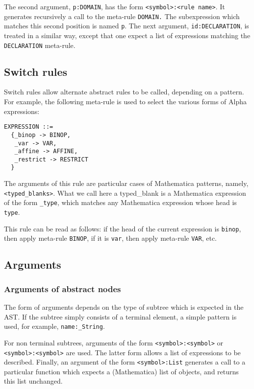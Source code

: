 \documentclass[12pt]{article}
\begin{document}
The second argument, 
\texttt{p:DOMAIN}, has the form 
\texttt{<symbol>:<rule name>}.
 It generates recursively a call to the meta-rule 
\texttt{DOMAIN.}
The subexpression which matches this second position is named 
\texttt{p}.
 The next argument, 
\texttt{id:{DECLARATION}}, is treated in a similar way, except that one expect a list of expressions
 matching the 
\texttt{DECLARATION} meta-rule.
 
\subsection{Switch rules}
\label{switchrules}
Switch rules allow alternate abstract rules to be called, depending on a
 pattern.
 For example, the following meta-rule is used to select the various forms
 of Alpha expressions:
\begin{verbatim}
EXPRESSION ::= 
  {_binop -> BINOP, 
   _var -> VAR, 
   _affine -> AFFINE, 
   _restrict -> RESTRICT 
  }
\end{verbatim}

The arguments of this rule are particular cases of Mathematica patterns,
 namely, 
\texttt{<typed\_blanks>}.
 What we call here a typed\_blank is a Mathematica expression of the form
 \texttt{\_type}, which matches any Mathematica expression whose head is 
\texttt{type}.
 
This rule can be read as follows: if the head of the current expression
 is 
\texttt{binop}, then apply meta-rule 
\texttt{BINOP}, if it is 
\texttt{var}, then apply meta-rule 
\texttt{VAR}, etc.

\subsection{Arguments}
\subsubsection{Arguments of abstract nodes}

The form of arguments depends on the type of subtree which is expected in
 the AST.
 If the subtree simply consists of a terminal element, a simple pattern
 is used, for example, 
\texttt{name:\_String}.

For non terminal subtrees, arguments of the form 
\texttt{<symbol>:<symbol>} or 
\texttt{<symbol>:{<symbol>}} are used.
 The latter form allows a list of expressions to be described.
 Finally, an argument of the form 
\texttt{<symbol>:{List}} generates a call to a particular function which expects a (Mathematica)
 list of objects, and returns this list unchanged.
 
\end{document}
